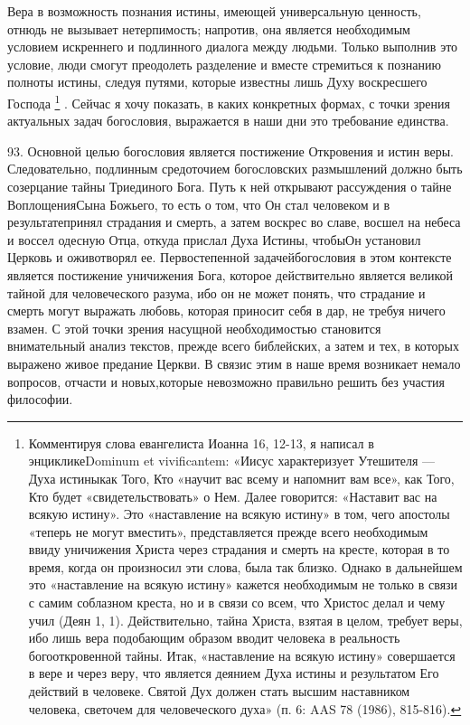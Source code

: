 \documentclass[a5paper,10pt]{article}
\begin{document}
Вера в возможность познания истины, имеющей универсальную ценность, отнюдь не
вызывает нетерпимость; напротив, она является необходимым условием искреннего и
подлинного диалога между людьми. Только выполнив это условие, люди смогут
преодолеть разделение и вместе стремиться к познанию полноты истины, следуя
путями, которые известны лишь Духу воскресшего Господа \footnote{Комментируя
слова евангелиста Иоанна 16, 12-13, я написал в энцикликеDominum et
vivificantem: «Иисус характеризует Утешителя — Духа истиныкак Того, Кто «научит
вас всему и напомнит вам все», как Того, Кто будет «свидетельствовать» о Нем.
Далее говорится: «Наставит вас на всякую истину». Это «наставление на всякую
истину» в том, чего апостолы «теперь не могут вместить», представляется прежде
всего необходимым ввиду уничижения Христа через страдания и смерть на кресте,
которая в то время, когда он произносил эти слова, была так близко. Однако в
дальнейшем это «наставление на всякую истину» кажется необходимым не только в
связи с самим соблазном креста, но и в связи со всем, что Христос делал и чему
учил (Деян 1, 1). Действительно, тайна Христа, взятая в целом, требует веры,
ибо лишь вера подобающим образом вводит человека в реальность богооткровенной
тайны. Итак, «наставление на всякую истину» совершается в вере и через веру,
что является деянием Духа истины и результатом Его действий в человеке. Святой
Дух должен стать высшим наставником человека, светочем для человеческого духа»
(п. 6: AAS 78 (1986), 815-816).} . Сейчас я хочу показать, в каких конкретных
формах, с точки зрения актуальных задач богословия, выражается в наши дни это
требование единства.

93. Основной целью богословия является постижение Откровения и истин веры.
Следовательно, подлинным средоточием богословских размышлений должно быть
созерцание тайны Триединого Бога. Путь к ней открывают рассуждения о тайне
ВоплощенияСына Божьего, то есть о том, что Он стал человеком и в
результатепринял страдания и смерть, а затем воскрес во славе, восшел на небеса
и воссел одесную Отца, откуда прислал Духа Истины, чтобыОн установил Церковь и
оживотворял ее. Первостепенной задачейбогословия в этом контексте является
постижение уничижения Бога, которое действительно является великой тайной для
человеческого разума, ибо он не может понять, что страдание и смерть могут
выражать любовь, которая приносит себя в дар, не требуя ничего взамен. С этой
точки зрения насущной необходимостью становится внимательный анализ текстов,
прежде всего библейских, а затем и тех, в которых выражено живое предание
Церкви. В связис этим в наше время возникает немало вопросов, отчасти и
новых,которые невозможно правильно решить без участия философии.
\end{document}

